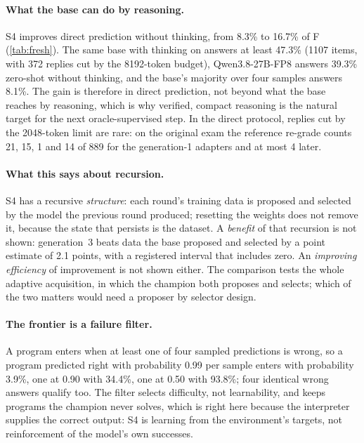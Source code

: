 \paragraph{What the base can do by reasoning.} S4 improves direct prediction without thinking, from 8.3\%
to 16.7\% of F (\cref{tab:fresh}). The same base with thinking on answers at least 47.3\% (1107 items,
with 372 replies cut by the 8192-token budget), Qwen3.8-27B-FP8 answers 39.3\% zero-shot without thinking,
and the base's majority over four samples answers 8.1\%. The gain is therefore in direct
prediction, not beyond what the base reaches by reasoning, which is why verified, compact reasoning is
the natural target for the next oracle-supervised step. In the direct protocol, replies cut by the
2048-token limit are rare: on the original exam the reference re-grade counts 21, 15, 1 and 14 of 889 for
the generation-1 adapters and at most 4 later.

\paragraph{What this says about recursion.} S4 has a recursive \emph{structure}: each round's training
data is proposed and selected by the model the previous round produced; resetting the weights does not
remove it, because the state that persists is the dataset. A \emph{benefit} of that recursion is not
shown: generation~3 beats data the base proposed and selected by a point estimate of 2.1 points, with a
registered interval that includes zero. An \emph{improving efficiency} of improvement is not shown
either. The comparison tests the whole adaptive acquisition, in which the champion both proposes and
selects; which of the two matters would need a proposer by selector design.

\paragraph{The frontier is a failure filter.} A program enters when at least one of four sampled
predictions is wrong, so a program predicted right with probability 0.99 per sample enters with
probability 3.9\%, one at 0.90 with 34.4\%, one at 0.50 with 93.8\%; four identical wrong answers qualify
too. The filter selects difficulty, not learnability, and keeps programs the champion never
solves, which is right here because the interpreter supplies the correct output: S4 is learning from the
environment's targets, not reinforcement of the model's own successes.
